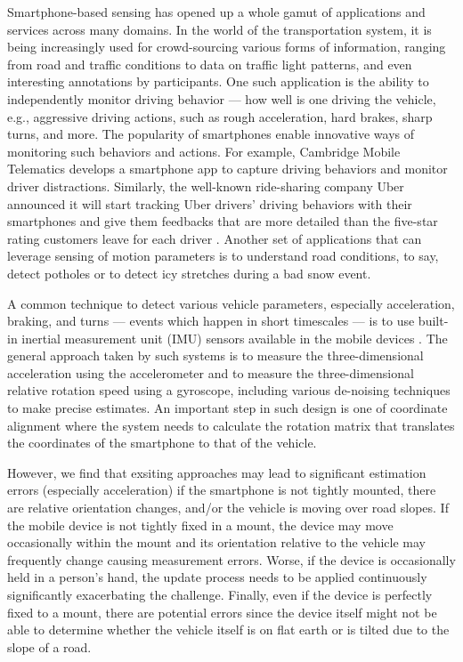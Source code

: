 

Smartphone-based sensing has opened up a whole gamut of applications and services
across many domains. In the world of the transportation system, it is being increasingly used
for crowd-sourcing various forms of information, ranging from road and traffic conditions to data on traffic light patterns,
and even interesting annotations by participants.
One such application is the ability to independently monitor driving behavior --- how well is one
driving the vehicle, e.g., aggressive driving actions, such as rough acceleration, hard brakes, sharp turns, and more.
The popularity of smartphones enable innovative ways of monitoring such behaviors and actions.
For example, Cambridge Mobile Telematics \cite{cmt} 
develops a smartphone
app to capture driving behaviors and monitor driver
distractions.
Similarly, the well-known ride-sharing company Uber announced
it will start tracking Uber drivers' driving behaviors
with their smartphones and give them feedbacks that are more detailed than 
the five-star rating customers leave for each driver \cite{uber}.
Another set of applications that can leverage sensing of motion parameters is to understand road conditions, to
say, detect potholes \cite{eriksson2008pothole} or to detect icy stretches during a bad snow event.

A common technique to detect various vehicle parameters, especially acceleration, braking, and turns ---
events which happen in short timescales --- is to use built-in inertial measurement unit (IMU) 
sensors available in the mobile devices \cite{wang2013sensing,hansenspeed,chen2015invisible}. 
The general approach taken by such systems is to measure the three-dimensional acceleration
using the accelerometer and to measure the three-dimensional relative rotation speed using
a gyroscope, including various de-noising techniques to make precise estimates.
An important step in such design is one of coordinate alignment where the system needs to
calculate the rotation matrix that translates 
the coordinates of the smartphone to that of the vehicle. 



However, we find that exsiting approaches may lead to significant estimation
errors (especially acceleration) if 
the smartphone is not tightly mounted, there are relative orientation changes,
and/or the vehicle is moving over road slopes. 
If the mobile device is not tightly fixed
in a mount, the device may move occasionally within the mount and its orientation 
relative to the vehicle may frequently change causing measurement
errors. Worse, if the device is occasionally held in a person's hand, the update process needs
to be applied continuously significantly exacerbating the challenge. Finally,
even if the device is perfectly fixed to a mount, there are potential errors since the device itself
might not be able to determine whether the vehicle itself is on flat earth or is 
tilted due to the slope of a road.





